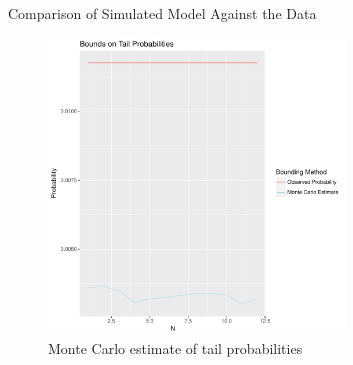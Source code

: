 \documentclass{beamer}
\begin{document}
\begin{frame}{Comparison of Simulated Model Against the Data}
  \begin{figure}
    \centering
    \includegraphics[width = 0.7\textwidth]{./10sept2015b-max-amp-sim-first-col.pdf}
    \caption{Monte Carlo estimate of tail probabilities}
  \end{figure}
\end{frame}
\end{document}
